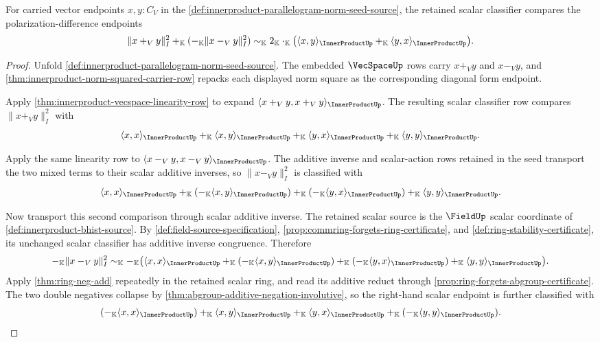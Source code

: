 \begin{theorem}
\label{thm:innerproduct-polarization-difference-row}
For carried vector endpoints $x,y:C_V$ in the
\autoref{def:innerproduct-parallelogram-norm-seed-source}, the retained scalar
classifier compares the polarization-difference endpoints
$$
\|x+_V y\|_{I}^{2}
+_{\mathbb{K}}
(-_{\mathbb{K}}\|x-_V y\|_{I}^{2})
\sim_{\mathbb{K}}
2_{\mathbb{K}}\cdot_{\mathbb{K}}
\bigl(
\langle x,y\rangle_{\InnerProductUp}
+_{\mathbb{K}}
\langle y,x\rangle_{\InnerProductUp}
\bigr).
$$
\end{theorem}
\begin{proof}
Unfold \autoref{def:innerproduct-parallelogram-norm-seed-source}. The
embedded $\VecSpaceUp$ rows carry $x+_V y$ and $x-_V y$, and
\autoref{thm:innerproduct-norm-squared-carrier-row} repacks each displayed norm
square as the corresponding diagonal form endpoint.

Apply \autoref{thm:innerproduct-vecspace-linearity-row} to expand
$\langle x+_V y,x+_V y\rangle_{\InnerProductUp}$. The resulting scalar
classifier row compares $\|x+_V y\|_{I}^{2}$ with
$$
\langle x,x\rangle_{\InnerProductUp}
+_{\mathbb{K}}
\langle x,y\rangle_{\InnerProductUp}
+_{\mathbb{K}}
\langle y,x\rangle_{\InnerProductUp}
+_{\mathbb{K}}
\langle y,y\rangle_{\InnerProductUp}.
$$

Apply the same linearity row to
$\langle x-_V y,x-_V y\rangle_{\InnerProductUp}$. The additive inverse and
scalar-action rows retained in the seed transport the two mixed terms to their
scalar additive inverses, so $\|x-_V y\|_{I}^{2}$ is classified with
$$
\langle x,x\rangle_{\InnerProductUp}
+_{\mathbb{K}}
(-_{\mathbb{K}}\langle x,y\rangle_{\InnerProductUp})
+_{\mathbb{K}}
(-_{\mathbb{K}}\langle y,x\rangle_{\InnerProductUp})
+_{\mathbb{K}}
\langle y,y\rangle_{\InnerProductUp}.
$$

Now transport this second comparison through scalar additive inverse. The
retained scalar source is the $\FieldUp$ scalar coordinate of
\autoref{def:innerproduct-bhist-source}. By
\autoref{def:field-source-specification},
\autoref{prop:commring-forgets-ring-certificate}, and
\autoref{def:ring-stability-certificate}, its unchanged scalar classifier has
additive inverse congruence. Therefore
$$
-_{\mathbb{K}}\|x-_V y\|_{I}^{2}
\sim_{\mathbb{K}}
-_{\mathbb{K}}\bigl(
\langle x,x\rangle_{\InnerProductUp}
+_{\mathbb{K}}
(-_{\mathbb{K}}\langle x,y\rangle_{\InnerProductUp})
+_{\mathbb{K}}
(-_{\mathbb{K}}\langle y,x\rangle_{\InnerProductUp})
+_{\mathbb{K}}
\langle y,y\rangle_{\InnerProductUp}
\bigr).
$$
Apply \autoref{thm:ring-neg-add} repeatedly in the retained scalar ring, and
read its additive reduct through \autoref{prop:ring-forgets-abgroup-certificate}.
The two double negatives collapse by
\autoref{thm:abgroup-additive-negation-involutive}, so the right-hand scalar
endpoint is further classified with
$$
(-_{\mathbb{K}}\langle x,x\rangle_{\InnerProductUp})
+_{\mathbb{K}}
\langle x,y\rangle_{\InnerProductUp}
+_{\mathbb{K}}
\langle y,x\rangle_{\InnerProductUp}
+_{\mathbb{K}}
(-_{\mathbb{K}}\langle y,y\rangle_{\InnerProductUp}).
$$


\end{proof}
